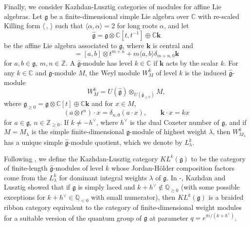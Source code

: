 \documentclass[11pt, reqno]{amsart}
\theoremstyle{definition}\newtheorem{defi}[thm]{Definition}
\theoremstyle{definition}\newtheorem{rem}[thm]{Remark}
\theoremstyle{definition}\newtheorem{exam}[thm]{Example}
\theoremstyle{definition}\newtheorem{assum}[thm]{Assumption}
\newcommand{\CC}{\mathbb{C}}
\newcommand{\ZZ}{\mathbb{Z}}
\newcommand{\QQ}{\mathbb{Q}}
\begin{document}
Finally, we consider Kazhdan-Lusztig categories of modules for affine Lie algebras. Let $\mathfrak{g}$ be a finite-dimensional simple Lie algebra over $\CC$ with re-scaled Killing form $\langle\,,\,\rangle$ such that $\langle\alpha,\alpha\rangle=2$ for long roots $\alpha$, and let
\begin{equation*}
\widehat{\mathfrak{g}}=\mathfrak{g}\otimes\CC[t,t^{-1}]\oplus\CC\mathbf{k}
\end{equation*}
be the affine Lie algebra associated to $\mathfrak{g}$, where $\mathbf{k}$ is central and
\begin{equation*}
[a\otimes t^m, b\otimes t^n] =[a,b]\otimes t^{m+n}+m\langle a,b\rangle\delta_{m+n,0}\mathbf{k} 
\end{equation*}
for $a,b\in\mathfrak{g}$, $m,n\in\ZZ$. A $\widehat{\mathfrak{g}}$-module has level $k\in\CC$ if $\mathbf{k}$ acts by the scalar $k$. For any $k\in\CC$ and $\mathfrak{g}$-module $M$, the Weyl module $W^k_M$ of level $k$ is the induced $\widehat{\mathfrak{g}}$-module
\begin{equation*}
W^k_M=U(\widehat{\mathfrak{g}})\otimes_{U(\widehat{\mathfrak{g}}_{\geq 0})} M,
\end{equation*}
where $\widehat{\mathfrak{g}}_{\geq 0}=\mathfrak{g}\otimes\CC[t]\oplus\CC\mathbf{k}$ and for $x\in M$,
\begin{equation*}
(a\otimes t^n)\cdot x =\delta_{n,0} (a\cdot x),\qquad\mathbf{k}\cdot x=kx
\end{equation*}
for $a\in\mathfrak{g}$, $n\in\ZZ_{\geq 0}$. If $k\neq -h^\vee$, where $h^\vee$ is the dual Coxeter number of $\mathfrak{g}$, and if $M=M_\lambda$ is the simple finite-dimensional $\mathfrak{g}$-module of highest weight $\lambda$, then $W^k_{M_\lambda}$ has a unique simple $\widehat{\mathfrak{g}}$-module quotient, which we denote by $L^k_\lambda$.

Following \cite[Definition 2.15]{KL1}, we define the Kazhdan-Lusztig category $KL^k(\mathfrak{g})$ to be the category of finite-length $\widehat{\mathfrak{g}}$-modules of level $k$ whose Jordan-H\"{o}lder composition factors come from the $L^k_\lambda$ for dominant integral weights $\lambda$ of $\mathfrak{g}$. In \cite{KL1}-\cite{KL4}, Kazhdan and Lusztig showed that if $\mathfrak{g}$ is simply laced and $k+h^\vee\notin\QQ_{\geq 0}$ (with some possible exceptions for $k+h^\vee\in\QQ_{<0}$ with small numerator), then $KL^k(\mathfrak{g})$ is a braided ribbon category equivalent to the category of finite-dimensional weight modules for a suitable version of the quantum group of $\mathfrak{g}$ at parameter $q=e^{\pi i/(k+h^\vee)}$. 
\end{document}
